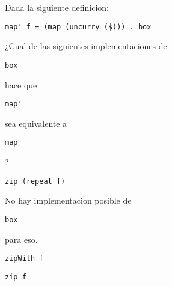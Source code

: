 \documentclass{gift}
\begin{document}
\begin{giftFragmento}
\end  {giftFragmento}


\begin{giftComentario}
 
\end  {giftComentario}

\begin{giftComentario}
 
\end  {giftComentario}
\begin{giftFragmento}
Dada la siguiente definicion:\end  {giftFragmento}

\verb!map' f = (map (uncurry ($))) . box!
\begin{giftFragmento}
¿Cual de las siguientes implementaciones de\end  {giftFragmento}

\verb!box!
\begin{giftFragmento}
hace que\end  {giftFragmento}

\verb!map'!
\begin{giftFragmento}
sea equivalente a\end  {giftFragmento}

\verb!map!
\begin{giftFragmento}
?\end  {giftFragmento}


\begin{giftShort}
\item \begin{giftFragmento}
\end  {giftFragmento}

\verb!zip (repeat f)!
\begin{giftFragmento}
\end  {giftFragmento}


\item \begin{giftFragmento}
No hay implementacion posible de\end  {giftFragmento}

\verb!box!
\begin{giftFragmento}
para eso.\end  {giftFragmento}


\item \begin{giftFragmento}
\end  {giftFragmento}

\verb!zipWith f!
\begin{giftFragmento}
\end  {giftFragmento}


\item \begin{giftFragmento}
\end  {giftFragmento}

\verb!zip f!
\begin{giftFragmento}
\end  {giftFragmento}


\end  {giftShort}
\end{document}
